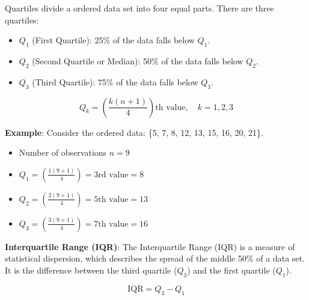 \documentclass[twoside]{book}
\begin{document}
Quartiles divide a ordered data set into four equal parts. There are three quartiles:

\begin{itemize}
    \item $Q_1$ (First Quartile): 25\% of the data falls below $Q_1$.
    \item $Q_2$ (Second Quartile or Median): 50\% of the data falls below $Q_2$.
    \item $Q_3$ (Third Quartile): 75\% of the data falls below $Q_3$.
\end{itemize}

\begin{textbox}
\[
Q_k = \left( \frac{k(n+1)}{4} \right)\text{th value}, \quad k = 1, 2, 3
\]
\end{textbox}


\textbf{Example}: Consider the ordered data: \{5, 7, 8, 12, 13, 15, 16, 20, 21\}.

\begin{itemize}
    \item Number of observations $ n = 9$
    \item $Q_1 = \left( \frac{1(9+1)}{4} \right) = \text{3rd value} = 8$
    \item $Q_2 = \left( \frac{2(9+1)}{4} \right) = \text{5th value} = 13$
    \item $Q_3 = \left( \frac{3(9+1)}{4} \right) = \text{7th value} = 16$
\end{itemize}

\textbf{Interquartile Range (IQR)}: The {Interquartile Range (IQR)} is a measure of statistical dispersion, which describes the spread of the middle 50\% of a data set. It is the difference between the third quartile (\(Q_3\)) and the first quartile (\(Q_1\)).

\begin{textbox}
    \[
    \text{IQR} = Q_3 - Q_1
    \]
\end{textbox}
\end{document}
